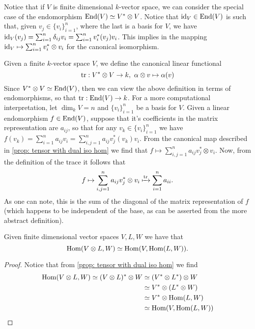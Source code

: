 Notice that if \(V\) is finite dimensional \(k\)-vector space, we can consider
the special case of the endomorphism \(\operatorname{End}(V) \simeq V^* \otimes V\). Notice
that \(\operatorname{id}_V \in \operatorname{End}(V)\) is such that, given \(v_j \in \{v_i\}_{i=1}^n\),
where the last is a basis for \(V\), we have \(\operatorname{id}_V(v_j) = \sum_{i=1}^n
\delta_{ij} v_i = \sum_{i=1}^n v_i^*(v_j) v_i\). This implies in the mapping
\(\operatorname{id}_V \mapsto \sum_{i=1}^n v_i^* \otimes v_i\) for the canonical isomorphism.

\begin{definition}[Trace]\label{def: trace}
  Given a finite \(k\)-vector space \(V\), we define the canonical linear
  functional
  \[
    \operatorname{tr}: V^* \otimes V \to k,\ \alpha \otimes v \mapsto
    \alpha(v)
  \]
  Since \(V^* \otimes V \simeq \operatorname{End}(V)\), then we can view the above definition in
  terms of endomorphisms, so that \(\operatorname{tr}: \operatorname{End}(V) \to k\). For a more
  computational interpretation, let \(\dim_k V = n\) and \(\{v_i\}_{i=1}^n\) be
  a basis for \(V\). Given a linear endomorphism \(f \in \operatorname{End}(V)\), suppose
  that it's coefficients in the matrix representation are \(a_{ij}\), so that
  for any \(v_k \in \{v_i\}_{i=1}^n\) we have \(f(v_k) = \sum_{i=1}^n a_{ij} v_i
  = \sum_{i,j=1}^n a_{ij} v_j^*(v_k) v_i\). From the canonical map described in
  \cref{prop: tensor with dual iso hom} we find that \(f \mapsto \sum_{i,j=1}^n
  a_{ij} v_j^* \otimes v_i\). Now, from the definition of the trace it follows
  that
  \[
    f \mapsto \sum_{i,j=1}^n a_{ij} v_j^* \otimes v_i \xmapsto{\operatorname{tr}}
    \sum_{i=1}^n a_{ii}.
  \]
  As one can note, this is the sum of the diagonal of the matrix representation
  of \(f\) (which happens to be independent of the base, as can be asserted from
  the more abstract definition).
\end{definition}

\begin{corollary}
  Given finite dimensional vector spaces \(V, L, W\) we have that
  \[
    \operatorname{Hom}(V \otimes L, W) \simeq \operatorname{Hom}(V, \operatorname{Hom}(L, W)).
  \]
\end{corollary}

\begin{proof}
  Notice that from \cref{prop: tensor with dual iso hom} we find
  \begin{align*}
    \operatorname{Hom}(V \otimes L, W) \simeq (V \otimes L)^* \otimes W
                         &\simeq (V^* \otimes L^*) \otimes W \\
                         &\simeq V^* \otimes (L^* \otimes W) \\
                         &\simeq V^* \otimes \operatorname{Hom}(L, W) \\
                         &\simeq \operatorname{Hom}(V, \operatorname{Hom}(L, W))
  \end{align*}
\end{proof}

